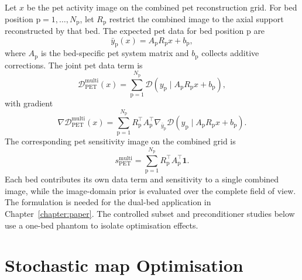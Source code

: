 Let $x$ be the \gls{pet} activity image on the combined \gls{pet} reconstruction grid. For bed position $\mathrm{p}=1,\ldots,N_{\mathrm{p}}$, let $R_{\mathrm{p}}$ restrict the combined image to the axial support reconstructed by that bed. The expected \gls{pet} data for bed position $\mathrm{p}$ are
\begin{equation}
    \bar y_{\mathrm{p}}(x)
    =
    A_{\mathrm{p}} R_{\mathrm{p}} x + b_{\mathrm{p}},
    \label{eq:multibed_forward_model}
\end{equation}
where $A_{\mathrm{p}}$ is the bed-specific \gls{pet} system matrix and $b_{\mathrm{p}}$ collects additive corrections. The joint \gls{pet} data term is
\begin{equation}
    \mathcal{D}_{\mathrm{PET}}^{\mathrm{multi}}(x)
    =
    \sum_{\mathrm{p}=1}^{N_{\mathrm{p}}}
    \mathcal{D}
    \left(
        y_{\mathrm{p}} \mid A_{\mathrm{p}} R_{\mathrm{p}} x + b_{\mathrm{p}}
    \right),
    \label{eq:multibed_data_term}
\end{equation}
with gradient
\begin{equation}
    \nabla \mathcal{D}_{\mathrm{PET}}^{\mathrm{multi}}(x)
    =
    \sum_{\mathrm{p}=1}^{N_{\mathrm{p}}}
    R_{\mathrm{p}}^\top
    A_{\mathrm{p}}^\top
    \nabla_{\bar y_{\mathrm{p}}}
    \mathcal{D}
    \left(
        y_{\mathrm{p}} \mid A_{\mathrm{p}} R_{\mathrm{p}} x + b_{\mathrm{p}}
    \right).
    \label{eq:multibed_gradient}
\end{equation}
The corresponding \gls{pet} sensitivity image on the combined grid is
\begin{equation}
    s_{\mathrm{PET}}^{\mathrm{multi}}
    =
    \sum_{\mathrm{p}=1}^{N_{\mathrm{p}}}
    R_{\mathrm{p}}^\top A_{\mathrm{p}}^\top \bm 1.
    \label{eq:multibed_sensitivity}
\end{equation}
Each bed contributes its own data term and sensitivity to a single combined image, while the image-domain prior is evaluated over the complete field of view. The formulation is needed for the dual-bed application in Chapter~\ref{chapter:paper}. The controlled subset and preconditioner studies below use a one-bed phantom to isolate optimisation effects.

\section{Stochastic \gls{map} Optimisation}
\label{sec:optimisation_svrg}

